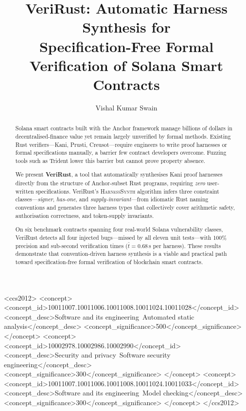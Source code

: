 \documentclass[sigconf,review,anonymous]{acmart}
\begin{document}
\title{VeriRust: Automatic Harness Synthesis for\\
Specification-Free Formal Verification of Solana Smart Contracts}

\author{Vishal Kumar Swain}

\begin{abstract}
Solana smart contracts built with the Anchor framework manage
billions of dollars in decentralised-finance value yet remain largely
unverified by formal methods.
Existing Rust verifiers---Kani, Prusti, Creusot---require engineers
to write proof harnesses or formal specifications manually, a barrier
few contract developers overcome.
Fuzzing tools such as Trident lower this barrier but cannot prove
property absence.

We present \textbf{VeriRust}, a tool that automatically synthesises
Kani proof harnesses directly from the structure of Anchor-subset Rust
programs, requiring \emph{zero} user-written specifications.
VeriRust's \textsc{HarnessSynth} algorithm infers three constraint
classes---\emph{signer}, \emph{has-one}, and
\emph{supply-invariant}---from idiomatic Rust naming conventions and
generates three harness types that collectively cover arithmetic
safety, authorisation correctness, and token-supply invariants.

On six benchmark contracts spanning four real-world Solana
vulnerability classes, VeriRust detects all four injected
bugs---missed by all eleven unit tests---with 100\% precision and
sub-second verification times ($\bar{t} = 0.68$\,s per harness).
These results demonstrate that convention-driven harness synthesis
is a viable and practical path toward specification-free formal
verification of blockchain smart contracts.
\end{abstract}

\begin{CCSXML}
<ccs2012>
  <concept>
    <concept_id>10011007.10011006.10011008.10011024.10011028</concept_id>
    <concept_desc>Software and its engineering~Automated static analysis</concept_desc>
    <concept_significance>500</concept_significance>
  </concept>
  <concept>
    <concept_id>10002978.10002986.10002990</concept_id>
    <concept_desc>Security and privacy~Software security engineering</concept_desc>
    <concept_significance>300</concept_significance>
  </concept>
  <concept>
    <concept_id>10011007.10011006.10011008.10011024.10011033</concept_id>
    <concept_desc>Software and its engineering~Model checking</concept_desc>
    <concept_significance>300</concept_significance>
  </concept>
</ccs2012>
\end{CCSXML}
\end{document}
